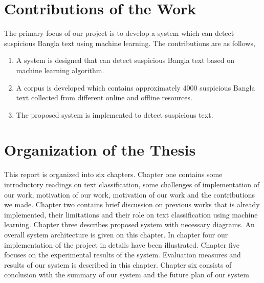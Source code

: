 \section{Contributions of the Work}
The primary focus of our project is to develop a system which can detect suspicious Bangla text using machine learning. The contributions are as follows,
\begin{enumerate}
    \item A system is designed that can detect suspicious Bangla text based on machine learning algorithm.
    
    \item A corpus is developed which contains approximately 4000 suspicious Bangla text collected from different online and offline resources.
    
    \item The proposed system is implemented to detect suspicious text.
\end{enumerate}
\clearpage

\section{Organization of the Thesis}
This report is organized into six chapters. Chapter one contains some introductory readings
on text classification, some challenges of implementation of our work, motivation of our work, motivation of our work and the contributions we made. Chapter two contains brief discussion on previous works that is already implemented, their limitations and their role on text classification using machine learning. Chapter three describes proposed system with necessary diagrams. An overall system architecture is given on this chapter. In chapter four our implementation of the project in details have been illustrated. Chapter five focuses on the experimental results of the system. Evaluation measures and results of our system is described in this chapter. Chapter six consists of conclusion with the summary of our system and
the future plan of our system
\clearpage